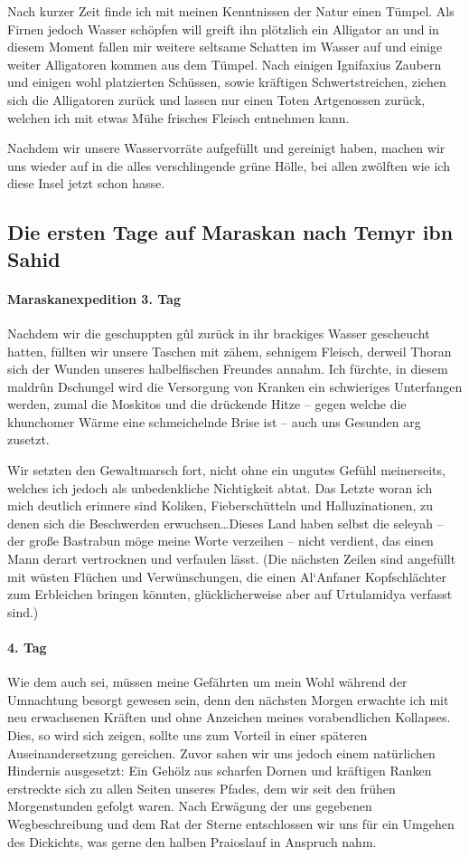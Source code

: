 Nach kurzer Zeit finde ich mit meinen Kenntnissen der Natur einen Tümpel. Als Firnen jedoch Wasser schöpfen will greift ihn plötzlich ein Alligator an und in diesem Moment fallen mir weitere seltsame Schatten im Wasser auf und einige weiter Alligatoren kommen aus dem Tümpel. Nach einigen Ignifaxius Zaubern und einigen wohl platzierten Schüssen, sowie kräftigen Schwertstreichen, ziehen sich die Alligatoren zurück und lassen nur einen Toten Artgenossen zurück, welchen ich mit etwas Mühe frisches Fleisch entnehmen kann. 

Nachdem wir unsere Wasservorräte aufgefüllt und gereinigt haben, machen wir uns wieder auf in die alles verschlingende grüne Hölle, bei allen zwölften wie ich diese Insel jetzt schon hasse.

\subsection{Die ersten Tage auf Maraskan nach Temyr ibn Sahid}

\paragraph{Maraskanexpedition 3. Tag}
Nachdem wir die geschuppten gûl zurück in ihr brackiges Wasser gescheucht hatten, füllten wir unsere Taschen mit zähem, sehnigem Fleisch, derweil Thoran sich der Wunden unseres halbelfischen Freundes annahm. Ich fürchte, in diesem maldrûn Dschungel wird die Versorgung von Kranken ein schwieriges Unterfangen werden, zumal die Moskitos und die drückende Hitze -- gegen welche die khunchomer Wärme eine schmeichelnde Brise ist -- auch uns Gesunden arg zusetzt. 

Wir setzten den Gewaltmarsch fort, nicht ohne ein ungutes Gefühl meinerseits, welches ich jedoch als unbedenkliche Nichtigkeit abtat. Das Letzte woran ich mich deutlich erinnere sind Koliken, Fieberschütteln und Halluzinationen, zu denen sich die Beschwerden erwuchsen\dots Dieses Land haben selbst die seleyah -- der große Bastrabun möge meine Worte verzeihen -- nicht verdient, das einen Mann derart vertrocknen und verfaulen lässt. (Die nächsten Zeilen sind angefüllt mit wüsten Flüchen und Verwünschungen, die einen Al`Anfaner Kopfschlächter zum Erbleichen bringen könnten, glücklicherweise aber auf Urtulamidya verfasst sind.)

\paragraph{4. Tag}
Wie dem auch sei, müssen meine Gefährten um mein Wohl während der Umnachtung besorgt gewesen sein, denn den nächsten Morgen erwachte ich mit neu erwachsenen Kräften und ohne Anzeichen meines vorabendlichen Kollapses. Dies, so wird sich zeigen, sollte uns zum Vorteil in einer späteren Auseinandersetzung gereichen. Zuvor sahen wir uns jedoch einem natürlichen Hindernis ausgesetzt: Ein Gehölz aus scharfen Dornen und kräftigen Ranken erstreckte sich zu allen Seiten unseres Pfades, dem wir seit den frühen Morgenstunden gefolgt waren. Nach Erwägung der uns gegebenen Wegbeschreibung und dem Rat der Sterne entschlossen wir uns für ein Umgehen des Dickichts, was gerne den halben Praioslauf in Anspruch nahm. 

